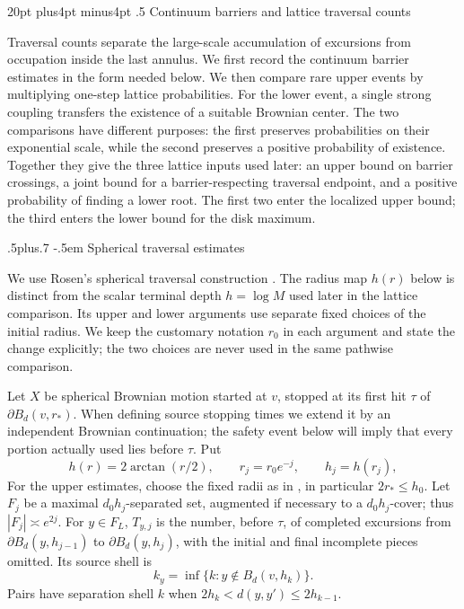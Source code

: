 \documentclass[12pt,reqno]{amsart}
\makeatletter
\def\section{\@startsection{section}{1}{0pt}%
  {20pt plus4pt minus4pt}
  {.5\linespacing}
  {\normalfont\bfseries}}
\def\subsection{\@startsection{subsection}{2}{0pt}%
  {.5\linespacing plus.7\linespacing}
  {-.5em}
  {\normalfont\scshape}}
\theoremstyle{plain}
\theoremstyle{definition}
\theoremstyle{remark}
\numberwithin{equation}{section}
\makeatother
\begin{document}
\section{Continuum barriers and lattice traversal counts}
\label{sec:continuum-transfer}

Traversal counts separate the large-scale accumulation of excursions from
occupation inside the last annulus.  We first record the continuum barrier
estimates in the form needed below.  We then compare rare upper events by
multiplying one-step lattice probabilities.  For the lower event, a single
strong coupling transfers the existence of a suitable Brownian center.
The two comparisons have different purposes: the first preserves probabilities
on their exponential scale, while the second preserves a positive probability
of existence.
Together they give the three lattice inputs used later: an upper bound on
barrier crossings, a joint bound for a barrier-respecting traversal endpoint,
and a positive probability of finding a lower root. The first two enter the
localized upper bound; the third enters the lower bound for the disk maximum.

\subsection{Spherical traversal estimates}

We use Rosen's spherical traversal construction \cite{Rosen2022}.
The radius map $h(r)$ below is distinct from the scalar terminal depth
$h=\log M$ used later in the lattice comparison.
Its upper and lower arguments use separate fixed choices of the initial
radius.  We keep the customary notation $r_0$ in each argument and state
the change explicitly; the two choices are never used in the same pathwise
comparison.

Let $X$ be spherical Brownian motion started at $v$, stopped at its
first hit $\tau$ of $\partial B_d(v,r_*)$.  When defining source
stopping times we extend it by an independent Brownian continuation;
the safety event below will imply that every portion actually used lies
before $\tau$.  Put
\begin{equation}
h(r)=2\arctan(r/2),\qquad r_j=r_0e^{-j},\qquad h_j=h(r_j),\label{eq:ct-external-23}
\end{equation}
For the upper estimates, choose the fixed radii as in
\cite[Section~2, (2.2)]{Rosen2022}, in particular $2r_*\le h_0$.  Let $F_j$ be a
maximal $d_0h_j$-separated set, augmented if necessary to a
$d_0h_j$-cover; thus $|F_j|\asymp e^{2j}$.  For $y\in F_L$,
$T_{y,j}$ is the number, before $\tau$, of completed excursions from
$\partial B_d(y,h_{j-1})$ to $\partial B_d(y,h_j)$, with the initial
and final incomplete pieces omitted.  Its source shell is
\begin{equation}
k_y=\inf\{k:y\notin B_d(v,h_k)\}.\label{eq:ct-external-24}
\end{equation}
Pairs have separation shell $k$ when
$2h_k<d(y,y')\le2h_{k-1}$.
\end{document}
